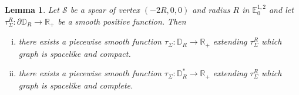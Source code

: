 \documentclass[a4paper,12pt]{article}
\def\R{\mathbb{R}}
\newcommand{\mass}[1]{{\mathbb E}^{1,2}_{#1}}
\newtheorem{lemou}{Lemma}[section]          %
\begin{document}
     
   \begin{lemou}\label{lem:curve_extension} Let $\mathcal S$ be a spear of vertex $(-2R,0,0)$ and radius $R$  in $\mass{0}$ and 
    let $\tau_{\Sigma}^R: \partial \mathbb D_R \rightarrow \R_+$ be a smooth positive function. Then 
    \begin{enumerate}[(i)]
     \item there exists a piecewise smooth function $\tau_\Sigma: \mathbb D_R\rightarrow \R_+$ extending $\tau_\Sigma^R$ which graph is spacelike and compact.
     \item there exists a piecewise smooth function $\tau_\Sigma:\mathbb D_R^*\rightarrow \R_+$ extending $\tau_\Sigma^R$ which graph is spacelike and complete.
    \end{enumerate}
    \end{lemou}
   
  
    
\end{document}
